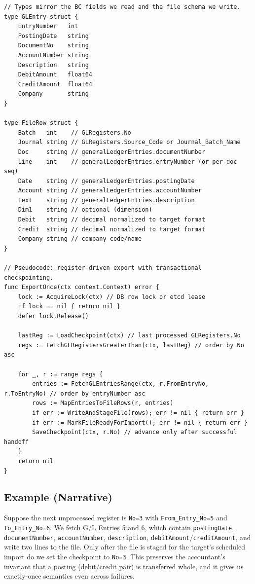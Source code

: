 \documentclass[a4paper,10pt]{article}
\begin{document}
\begin{verbatim}
// Types mirror the BC fields we read and the file schema we write.
type GLEntry struct {
    EntryNumber   int
    PostingDate   string
    DocumentNo    string
    AccountNumber string
    Description   string
    DebitAmount   float64
    CreditAmount  float64
    Company       string
}

type FileRow struct {
    Batch   int    // GLRegisters.No
    Journal string // GLRegisters.Source_Code or Journal_Batch_Name
    Doc     string // generalLedgerEntries.documentNumber
    Line    int    // generalLedgerEntries.entryNumber (or per-doc seq)
    Date    string // generalLedgerEntries.postingDate
    Account string // generalLedgerEntries.accountNumber
    Text    string // generalLedgerEntries.description
    Dim1    string // optional (dimension)
    Debit   string // decimal normalized to target format
    Credit  string // decimal normalized to target format
    Company string // company code/name
}

// Pseudocode: register-driven export with transactional checkpointing.
func ExportOnce(ctx context.Context) error {
    lock := AcquireLock(ctx) // DB row lock or etcd lease
    if lock == nil { return nil }
    defer lock.Release()

    lastReg := LoadCheckpoint(ctx) // last processed GLRegisters.No
    regs := FetchGLRegistersGreaterThan(ctx, lastReg) // order by No asc

    for _, r := range regs {
        entries := FetchGLEntriesRange(ctx, r.FromEntryNo, r.ToEntryNo) // order by entryNumber asc
        rows := MapEntriesToFileRows(r, entries)
        if err := WriteAndStageFile(rows); err != nil { return err }
        if err := MarkFileReadyForImport(); err != nil { return err }
        SaveCheckpoint(ctx, r.No) // advance only after successful handoff
    }
    return nil
}
\end{verbatim}

\subsection{Example (Narrative)}

Suppose the next unprocessed register is \texttt{No=3} with \texttt{From\_Entry\_No=5} and \texttt{To\_Entry\_No=6}. We fetch G/L Entries 5 and 6, which contain \texttt{postingDate}, \texttt{documentNumber}, \texttt{accountNumber}, \texttt{description}, \texttt{debitAmount}/\texttt{creditAmount}, and write two lines to the file. Only after the file is staged for the target’s scheduled import do we set the checkpoint to \texttt{No=3}. This preserves the accountant’s invariant that a posting (debit/credit pair) is transferred whole, and it gives us exactly-once semantics even across failures.
\end{document}
